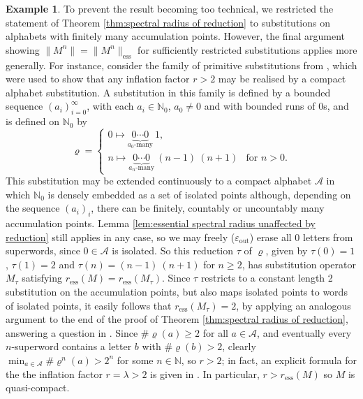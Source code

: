 \documentclass[11pt]{amsart}
\numberwithin{equation}{section}
\theoremstyle{plain}
\theoremstyle{definition}
\newtheorem{example}[theorem]{Example}
\newcommand{\N}{{\mathbb N}}
\newcommand{\mc}{\mathcal}
\newcommand{\A}{\mc A}
\newcommand{\sub}{\varrho}
\begin{document}
\begin{example}
To prevent the result becoming too technical, we restricted the statement of Theorem \ref{thm:spectral radius of reduction} to substitutions on alphabets with finitely many accumulation points. However, the final argument showing \(\|M^n\| = \|M^n\|_\mathrm{ess}\) for sufficiently restricted substitutions applies more generally. For instance, consider the family of primitive substitutions from \cite{FGM24}, which were used to show that any inflation factor \(r > 2\) may be realised by a compact alphabet substitution. A substitution in this family is defined by a bounded sequence \((a_i)_{i=0}^\infty\), with each \(a_i \in \N_0\), \(a_0 \neq 0\) and with bounded runs of \(0\)s, and is defined on \(\N_0\) by
\[
\sub = 
\begin{cases}
0 \mapsto \underbrace{0 \cdots 0}_{a_0 \text{-many}} \ 1 ,            & \\
n \mapsto \underbrace{0 \cdots 0}_{a_n \text{-many}} \ (n-1) \ (n+1) & \text{for } n > 0 . 
\end{cases}
\]
This substitution may be extended continuously to a compact alphabet \(\A\) in which \(\N_0\) is densely embedded as a set of isolated points although, depending on the sequence \((a_i)_i\), there can be finitely, countably or uncountably many accumulation points. Lemma \ref{lem:essential spectral radius unaffected by reduction} still applies in any case, so we may freely (\(\varepsilon_\mathrm{out}\)) erase all \(0\) letters from superwords, since \(0 \in \A\) is isolated. So this reduction \(\tau\) of \(\sub\), given by \(\tau(0) = 1\), \(\tau(1) = 2\) and \(\tau(n) = (n-1) \ (n+1)\) for \(n \geq 2\), has substitution operator \(M_\tau\) satisfying \(r_\mathrm{ess}(M) = r_\mathrm{ess}(M_\tau)\). Since \(\tau\) restricts to a constant length 2 substitution on the accumulation points, but also maps isolated points to words of isolated points, it easily follows that \(r_\mathrm{ess}(M_\tau) = 2\), by applying an analogous argument to the end of the proof of Theorem \ref{thm:spectral radius of reduction}, answering a question in \cite[Section 7]{FGM24}. Since \(\# \sub(a) \geq 2\) for all \(a \in \A\), and eventually every \(n\)-superword contains a letter \(b\) with \(\# \sub(b) > 2\), clearly \(\min_{a \in \A} \# \sub^n(a) > 2^n\) for some \(n \in \N\), so \(r > 2\); in fact, an explicit formula for the the inflation factor \(r = \lambda > 2\) is given in \cite[Section 4]{FGM24}. In particular, \(r > r_\mathrm{ess}(M)\) so \(M\) is quasi-compact.
\end{example}
\end{document}
